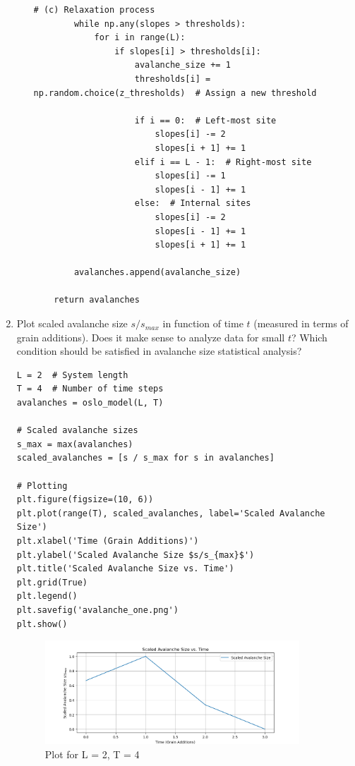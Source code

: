 \documentclass[10pt,letterpaper, onecolumn]{report}
\begin{document}
\begin{flushleft}
\begin{enumerate}
\begin{enumerate}
\begin{lstlisting}[style=myPythonStyle, caption={Oslo Model Algorithm (Python version 3.11.7)}]
        # (c) Relaxation process
        while np.any(slopes > thresholds):
            for i in range(L):
                if slopes[i] > thresholds[i]:
                    avalanche_size += 1
                    thresholds[i] = np.random.choice(z_thresholds)  # Assign a new threshold

                    if i == 0:  # Left-most site
                        slopes[i] -= 2
                        slopes[i + 1] += 1
                    elif i == L - 1:  # Right-most site
                        slopes[i] -= 1
                        slopes[i - 1] += 1
                    else:  # Internal sites
                        slopes[i] -= 2
                        slopes[i - 1] += 1
                        slopes[i + 1] += 1

        avalanches.append(avalanche_size)

    return avalanches
            \end{lstlisting}
        \end{enumerate}
        \hfill\break

            \item Plot scaled avalanche size $ s/s_{max} $ in function of time $t$ (measured in terms of grain additions). Does
            it make sense to analyze data for small $t$? Which condition should be satisfied in avalanche size
            statistical analysis?
            \hfill\break


            \begin{lstlisting}[style=myPythonStyle, caption={Oslo Model Algorithm (Python version 3.11.7)}]
L = 2  # System length
T = 4  # Number of time steps
avalanches = oslo_model(L, T)

# Scaled avalanche sizes
s_max = max(avalanches)
scaled_avalanches = [s / s_max for s in avalanches]

# Plotting
plt.figure(figsize=(10, 6))
plt.plot(range(T), scaled_avalanches, label='Scaled Avalanche Size')
plt.xlabel('Time (Grain Additions)')
plt.ylabel('Scaled Avalanche Size $s/s_{max}$')
plt.title('Scaled Avalanche Size vs. Time')
plt.grid(True)
plt.legend()
plt.savefig('avalanche_one.png')
plt.show()
            \end{lstlisting}
            \clearpage

            \begin{figure}[htbp!]
                \centering
                \includegraphics[width=0.9\textwidth]{../avalanche_one.png}
                \caption{Plot for L = 2, T = 4}
            \end{figure}


\end{enumerate}
\end{flushleft}
\end{document}

